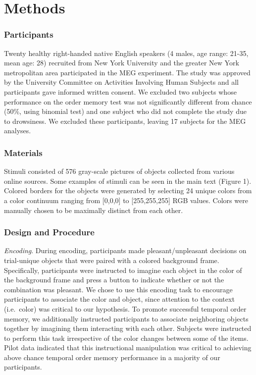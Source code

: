 \section{Methods}\label{methods}

\subsubsection{Participants}\label{participants}

Twenty healthy right-handed native English speakers (4 males, age range:
21-35, mean age: 28) recruited from New York University and the greater
New York metropolitan area participated in the MEG experiment. The study
was approved by the University Committee on Activities Involving Human
Subjects and all participants gave informed written consent. We excluded
two subjects whose performance on the order memory test was not
significantly different from chance (50\%, using binomial test) and one
subject who did not complete the study due to drowsiness. We excluded
these participants, leaving 17 subjects for the MEG analyses.

\subsubsection{Materials}\label{materials}

Stimuli consisted of 576 gray-scale pictures of objects collected from
various online sources. Some examples of stimuli can be seen in the main
text (Figure 1). Colored borders for the objects were generated by
selecting 24 unique colors from a color continuum ranging from
{[}0,0,0{]} to {[}255,255,255{]} RGB values. Colors were manually chosen
to be maximally distinct from each other.

\subsubsection{Design and Procedure}\label{design-and-procedure}

\emph{Encoding}. During encoding, participants made pleasant/unpleasant
decisions on trial-unique objects that were paired with a colored
background frame. Specifically, participants were instructed to imagine
each object in the color of the background frame and press a button to
indicate whether or not the combination was pleasant. We chose to use
this encoding task to encourage participants to associate the color and
object, since attention to the context (i.e.~color) was critical to our
hypothesis. To promote successful temporal order memory, we additionally
instructed participants to associate neighboring objects together by
imagining them interacting with each other. Subjects were instructed to
perform this task irrespective of the color changes between some of the
items. Pilot data indicated that this instructional manipulation was
critical to achieving above chance temporal order memory performance in
a majority of our participants.

